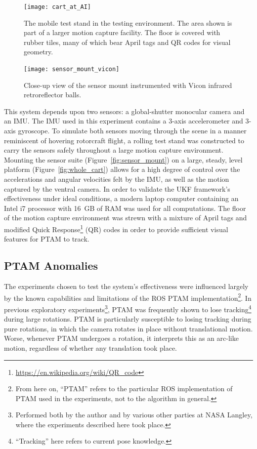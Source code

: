 \begin{figure}
  \centering
    \texttt{[image: cart\_at\_AI]}
  \caption[Testing Environment]{The mobile test stand in the testing environment. The area shown is part of a larger motion capture facility. The floor is covered with rubber tiles, many of which bear April tags and QR codes for visual geometry.}
  \label{fig:cart_at_AI}
\end{figure}

\begin{figure}
  \centering
    \texttt{[image: sensor\_mount\_vicon]}
  \caption[Sensor Mount Instrumented with Retroreflectors]{Close-up view of the sensor mount instrumented with Vicon infrared retroreflector balls.}
  \label{fig:sensor_mount_vicon}
\end{figure}

This system depends upon two sensors: a global-shutter monocular camera and an IMU. The IMU used in this experiment contains a 3-axis accelerometer and 3-axis gyroscope. To simulate both sensors moving through the scene in a manner reminiscent of hovering rotorcraft flight, a rolling test stand was constructed to carry the sensors safely throughout a large motion capture environment. Mounting the sensor suite (Figure~\ref{fig:sensor_mount}) on a large, steady, level platform (Figure~\ref{fig:whole_cart}) allows for a high degree of control over the accelerations and angular velocities felt by the IMU, as well as the motion captured by the ventral camera. In order to validate the UKF framework's effectiveness under ideal conditions, a modern laptop computer containing an Intel i7 processor with 16~GB of RAM was used for all computations. The floor of the motion capture environment was strewn with a mixture of April tags and modified Quick Response\footnote{\url{https://en.wikipedia.org/wiki/QR_code}} (QR) codes in order to provide sufficient visual features for PTAM to track.

\subsection{PTAM Anomalies}

The experiments chosen to test the system's effectiveness were influenced largely by the known capabilities and limitations of the ROS PTAM implementation\footnote{From here on, ``PTAM'' refers to the particular ROS implementation of PTAM used in the experiments, not to the algorithm in general.}. In previous exploratory experiments\footnote{Performed both by the author and by various other parties at NASA Langley, where the experiments described here took place.}, PTAM was frequently shown to lose tracking\footnote{``Tracking'' here refers to current pose knowledge.} during large rotations. PTAM is particularly susceptible to losing tracking during pure rotations, in which the camera rotates in place without translational motion. Worse, whenever PTAM undergoes a rotation, it interprets this as an arc-like motion, regardless of whether any translation took place.







